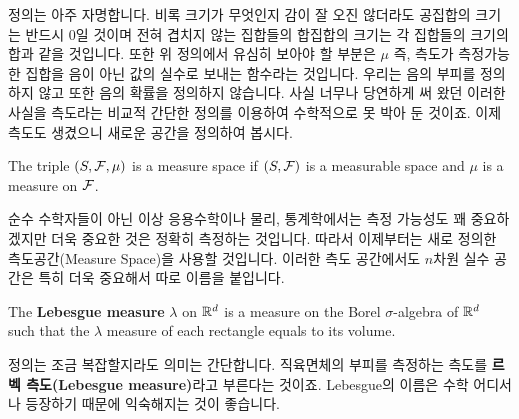 \documentclass[final]{IEEEphot}
\begin{document}
정의는 아주 자명합니다. 비록 크기가 무엇인지 감이 잘 오진 않더라도 공집합의 크기는 반드시 0일 것이며 전혀 겹치지 않는 집합들의 합집합의 크기는 각 집합들의 크기의 합과 같을 것입니다. 또한 위 정의에서 유심히 보아야 할 부분은 $\mu$ 즉, 측도가 측정가능한 집합을 음이 아닌 값의 실수로 보내는 함수라는 것입니다. 우리는 음의 부피를 정의하지 않고 또한 음의 확률을 정의하지 않습니다. 사실 너무나 당연하게 써 왔던 이러한 사실을 측도라는 비교적 간단한 정의를 이용하여 수학적으로 못 박아 둔 것이죠.   이제 측도도 생겼으니 새로운 공간을 정의하여 봅시다.

\begin{definition}
 The triple $(S,\mathcal{F},\mu)$ is a measure space if $(S,\mathcal{F})$ is a measurable space and $\mu$ is a measure on $\mathcal{F}$.
 
 \HL
\end{definition}

순수 수학자들이 아닌 이상 응용수학이나 물리, 통계학에서는 측정 가능성도 꽤 중요하겠지만 더욱 중요한 것은 정확히 측정하는 것입니다. 따라서 이제부터는 새로 정의한 측도공간(Measure Space)을 사용할 것입니다. 이러한 측도 공간에서도 $n$차원 실수 공간은 특히 더욱 중요해서 따로 이름을 붙입니다.

\begin{definition}
 The \textbf{Lebesgue measure} $\lambda$ on $\mathbb{R}^d$ is a measure on the Borel $\sigma$-algebra of $\mathbb{R}^d$ such that the $\lambda$ measure of each rectangle equals to its volume.
 
 \HL
\end{definition}

정의는 조금 복잡할지라도 의미는 간단합니다. 직육면체의 부피를 측정하는 측도를 \textbf{르벡 측도(Lebesgue measure)}라고 부른다는 것이죠. Lebesgue의 이름은 수학 어디서나 등장하기 때문에 익숙해지는 것이 좋습니다.




%
%


\end{document}
